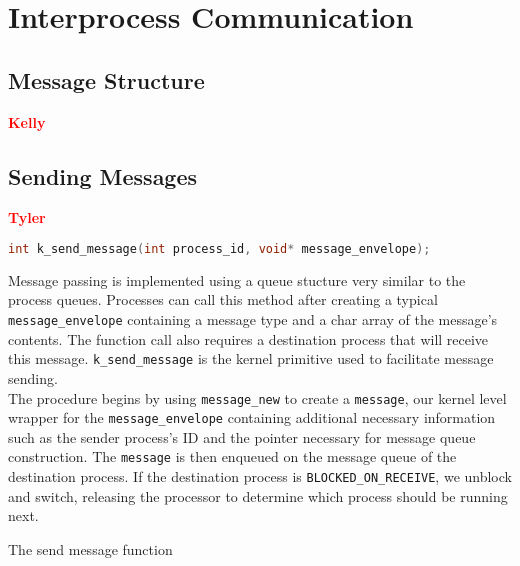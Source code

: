 \documentclass[12pt]{report}
\begin{document}

\section{Interprocess Communication}

\subsection{Message Structure}

\textcolor{red}{\textbf{Kelly}} \\


\subsection{Sending Messages}

\textcolor{red}{\textbf{Tyler}} \\
\begin{minipage}{\textwidth}
\begin{lstlisting}[language=C, frame=single]
int k_send_message(int process_id, void* message_envelope);
\end{lstlisting}
\end{minipage}

Message passing is implemented using a queue stucture very similar to the process queues. Processes can call this method after creating a typical {\tt message_envelope} containing a message type and a char array of the message's contents. The function call also requires a destination process that will receive this message. {\tt k\_send\_message} is the kernel primitive used to facilitate message sending.\\

The procedure begins by using {\tt message\_new} to create a {\tt message}, our kernel level wrapper for the {\tt message_envelope} containing additional necessary information such as the sender process's ID and the pointer necessary for message queue construction. The {\tt message} is then enqueued on the message queue of the destination process. If the destination process is {\tt BLOCKED\_ON\_RECEIVE}, we unblock and switch, releasing the processor to determine which process should be running next. \\

\begin{algorithm}
  \caption{The send message function}
  \begin{algorithmic}[1]
      
		\EndIf
    \EndProcedure
  \end{algorithmic}
\end{algorithm}
\end{document}
